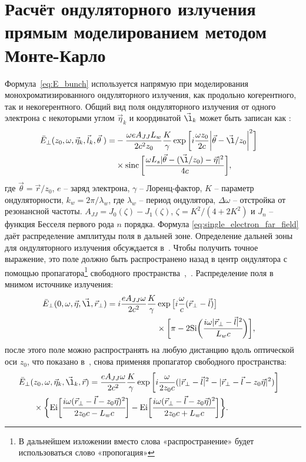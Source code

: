 \section{Расчёт ондуляторного излучения прямым моделированием методом Монте-Карло}
Формула~\ref{eq:E_bunch} используется напрямую при моделирования монохроматизированного ондуляторного излучения, как продольно когерентного, так и некогерентного. Общий вид поля ондуляторного излучения от одного электрона с некоторыми углом $\vec{\eta}_k$ и координатой $\vec{\l}_k$ может быть записан как \cite{geloni_fourier_2007}: 
\begin{align}
	\bar{E}_{\bot}(z_0, \omega, \vec{\eta}_k, \vec{l}_k, \vec{\theta} \;) =
&	-\frac{\omega e A_{JJ} L_w}{2c^2z_0}\frac{K}{\gamma}\exp{\bigg[i \frac{\omega z_0}{2c} \bigg|\vec{\theta} - \vec{\l}/z_0\bigg|^2 \bigg]} \cr & \times \sinc \bigg[\frac{\omega L_s |\vec{\theta} - (\vec{\l}/z_0) - \vec{\eta}|^2}{4c}\bigg],
	\label{eq:single_electron_far_field}
\end{align}
где $\vec{\theta} = \vec{r}/z_0$, $e$ -- заряд электрона, $\gamma$ -- Лоренц-фактор, $K$ -- параметр ондуляторности, $k_w = 2 \pi / \lambda_w$, где $\lambda_w$ -- период ондулятора, $\Delta \omega$ -- отстройка от резонансной частоты. $A_{JJ} = J_0(\zeta) - J_1(\zeta)$, $\zeta = K^2/(4 + 2K^2)$ и $J_n$ -- функция Бесселя первого рода $n$ порядка. Формула \ref{eq:single_electron_far_field} даёт распределение амплитуды поля в дальней зоне. Определение дальней зоны для ондуляторного излучения обсуждается в~\cite{geloni_fourier_2007}. Чтобы получить точное выражение, это поле должно быть распространено назад в центр ондулятора с помощью пропагатора\footnote{В дальнейшем изложении вместо слова «распространение» будет использоваться слово «пропогация»} свободного пространства~\cite{voelz_computational_2011},~\cite{schmidt_numerical_2010}. Распределение поля в мнимом источнике излучения:
\begin{align}
	\bar{E}_{\bot}(0, \omega, \vec{\eta}, \vec{\l}, \vec{r}_{\bot}) =
	i \frac{e A_{JJ} \omega}{2 c^2}\frac{K}{\gamma} &\exp{\big[i \frac{\omega}{c} (\vec{r}_{\bot} - \vec{l})\big]}\cr & \times \bigg [\pi - 2\text{Si} \bigg( \cfrac{i \omega |\vec{r}_{\bot} - \vec{l}|^2}{L_w c}\bigg)\bigg], 
	\label{eq:single_electron_near_field_z=0}
\end{align}
после этого поле можно распространять на любую дистанцию вдоль оптической оси $z_0$, что показано в~\cite{geloni_fourier_2007}, снова применяя пропагатор свободного пространства:
\begin{align}
	\bar{E}_{\bot}(&z_0, \omega, \vec{\eta}_k, \vec{\l}_k, \vec{r}) =
		\frac{e A_{JJ} \omega}{2 c^2}\frac{K}{\gamma} \exp{\bigg[i \frac{\omega}{2 z_0 c} (|\vec{r}_{\bot} - \vec{l}|^2 - |\vec{r}_{\bot} - \vec{l} - z_0 \vec{\eta}|^2) \bigg]} \cr & \times	\bigg \{ \text{Ei} \bigg[ \cfrac{i \omega (\vec{r}_{\bot} - \vec{l} - z_0 \vec{\eta})^2}{2z_0c - L_w c}\bigg] - \text{Ei} \bigg[ \cfrac{i \omega (\vec{r}_{\bot} - \vec{l} - z_0 \vec{\eta})^2}{2z_0c + L_w c} \bigg] \bigg\}.
	\label{eq:single_electron_near_field}
\end{align}
